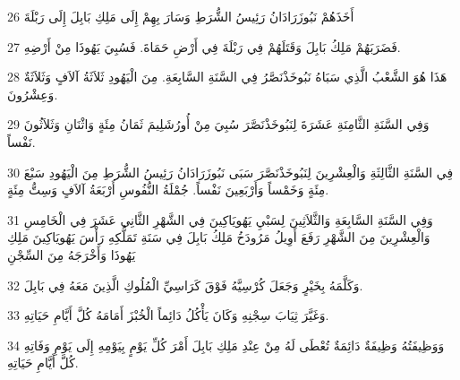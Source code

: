 \par 26 أَخَذَهُمْ نَبُوزَرَادَانُ رَئِيسُ الشُّرَطِ وَسَارَ بِهِمْ إِلَى مَلِكِ بَابِلَ إِلَى رَبْلَةَ
\par 27 فَضَرَبَهُمْ مَلِكُ بَابِلَ وَقَتَلَهُمْ فِي رَبْلَةَ فِي أَرْضِ حَمَاةَ. فَسُبِيَ يَهُوذَا مِنْ أَرْضِهِ.
\par 28 هَذَا هُوَ الشَّعْبُ الَّذِي سَبَاهُ نَبُوخَذْنَصَّرُ فِي السَّنَةِ السَّابِعَةِ. مِنَ الْيَهُودِ ثَلاَثَةُ آلاَفٍ وَثَلاَثَةٌ وَعِشْرُونَ.
\par 29 وَفِي السَّنَةِ الثَّامِنَةِ عَشَرَةَ لِنَبُوخَذْنَصَّرَ سُبِيَ مِنْ أُورُشَلِيمَ ثَمَانُ مِئَةٍ وَاثْنَانِ وَثَلاَثُونَ نَفْساً.
\par 30 فِي السَّنَةِ الثَّالِثَةِ وَالْعِشْرِينَ لِنَبُوخَذْنَصَّرَ سَبَى نَبُوزَرَادَانُ رَئِيسُ الشُّرَطِ مِنَ الْيَهُودِ سَبْعَ مِئَةٍ وَخَمْساً وَأَرْبَعِينَ نَفْساً. جُمْلَةُ النُّفُوسِ أَرْبَعَةُ آلاَفٍ وَسِتُّ مِئَةٍ.
\par 31 وَفِي السَّنَةِ السَّابِعَةِ وَالثَّلاَثِينَ لِسَبْيِ يَهُويَاكِينَ فِي الشَّهْرِ الثَّانِي عَشَرَ فِي الْخَامِسِ وَالْعِشْرِينَ مِنَ الشَّهْرِ رَفَعَ أَوِيلُ مَرُودَخُ مَلِكُ بَابِلَ فِي سَنَةِ تَمَلُّكِهِ رَأْسَ يَهُويَاكِينَ مَلِكِ يَهُوذَا وَأَخْرَجَهُ مِنَ السِّجْنِ
\par 32 وَكَلَّمَهُ بِخَيْرٍ وَجَعَلَ كُرْسِيَّهُ فَوْقَ كَرَاسِيِّ الْمُلُوكِ الَّذِينَ مَعَهُ فِي بَابِلَ.
\par 33 وَغَيَّرَ ثِيَابَ سِجْنِهِ وَكَانَ يَأْكُلُ دَائِماً الْخُبْزَ أَمَامَهُ كُلَّ أَيَّامِ حَيَاتِهِ.
\par 34 وَوَظِيفَتُهُ وَظِيفَةٌ دَائِمَةٌ تُعْطَى لَهُ مِنْ عِنْدِ مَلِكِ بَابِلَ أَمْرَ كُلِّ يَوْمٍ بِيَوْمِهِ إِلَى يَوْمِ وَفَاتِهِ كُلَّ أَيَّامِ حَيَاتِهِ.

